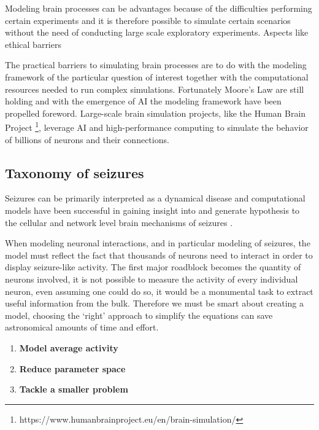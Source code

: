 \documentclass[../../Orator.tex]{subfiles}
\begin{document}
Modeling brain processes can be advantages because of the difficulties  performing certain experiments and it is therefore possible to simulate certain scenarios without the need of conducting large scale exploratory experiments. Aspects like ethical barriers

The practical barriers to simulating brain processes are to do with the modeling framework of the particular question of interest together with the computational resources needed to run complex simulations. Fortunately Moore's Law are still holding and with the emergence of AI the modeling framework have been propelled foreword. Large-scale brain simulation projects, like the Human Brain Project \footnote{https://www.humanbrainproject.eu/en/brain-simulation/}, leverage AI and high-performance computing to simulate the behavior of billions of neurons and their connections.


\subsection*{Taxonomy of seizures}

Seizures can be primarily interpreted as a dynamical disease \cite{da2003epilepsies, milton2010epilepsy} and computational models have been successful in gaining insight into and generate hypothesis to the cellular and network level brain mechanisms of seizures \cite{bazhenov2008cellular}.




When modeling neuronal interactions, and in particular modeling of seizures, the model must reflect the fact that thousands of neurons need to interact in order to display seizure-like activity. 
The first major roadblock becomes the quantity of neurons involved, it is not possible to measure the activity of every individual neuron, even assuming one could do so, it would be a monumental task to extract useful information from the bulk. 
Therefore we must be smart about creating a model, choosing the `right' approach to simplify the equations can save astronomical amounts of time and effort.
\begin{enumerate}
    \item \textbf{Model average activity}
    \item \textbf{Reduce parameter space}
    \item \textbf{Tackle a smaller problem}
\end{enumerate}
\end{document}
